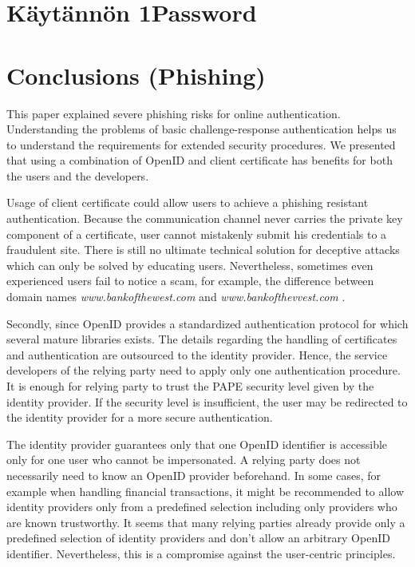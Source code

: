 \documentclass[english,gradu]{tktltiki}
\begin{document}
\section{Käytännön 1Password} %
\label{sec:käytännön_1password}




\section{Conclusions (Phishing)} %
\label{sec:conclusions_phishing_}

                 This paper explained severe phishing risks for online authentication. Understanding the problems of basic challenge-response authentication helps us to understand the requirements for extended security procedures. We presented that using a combination of OpenID and client certificate has benefits for both the users and the developers.

                 Usage of client certificate could allow users to achieve a phishing resistant authentication. Because the communication channel never carries the private key component of a certificate, user cannot mistakenly submit his credentials to a fraudulent site. There is still no ultimate technical solution for deceptive attacks which can only be solved by educating users. Nevertheless, sometimes even experienced users fail to notice a scam, for example, the difference between domain names
           \emph{www.bankofthewest.com} and \emph{www.bankofthevvest.com} \cite{why_phishing_works_06}.

                 Secondly, since OpenID provides a standardized authentication protocol for which several mature libraries exists. The details regarding the handling of certificates and authentication are outsourced to the identity provider. Hence, the service developers of the relying party need to apply only one authentication procedure. It is enough for relying party to trust the PAPE security level given by the identity provider. If the security level is insufficient, the user may be redirected to the identity provider for a more secure authentication.

                 The identity provider guarantees only that one OpenID identifier is accessible only for one user who cannot be impersonated. A relying party does not necessarily need to know an OpenID provider beforehand. In some cases, for example when handling financial transactions, it might be recommended to allow identity providers only from a predefined selection including only providers who are known trustworthy. It seems that many relying parties already provide only a predefined selection of identity providers and don't allow an arbitrary OpenID identifier. Nevertheless, this is a compromise against the user-centric principles.
\end{document}
